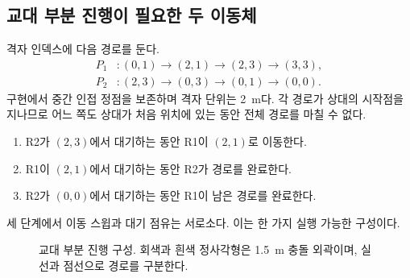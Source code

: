 \documentclass[11pt,a4paper]{article}
\theoremstyle{remark}
\begin{document}
\subsection{교대 부분 진행이 필요한 두 이동체}
격자 인덱스에 다음 경로를 둔다.
\begin{align}
 P_1 &: (0,1)\to(2,1)\to(2,3)\to(3,3),\nonumber\\
 P_2 &: (2,3)\to(0,3)\to(0,1)\to(0,0).
 \label{eq:alternating}
\end{align}
구현에서 중간 인접 정점을 보존하며 격자 단위는 2~m다. 각 경로가 상대의 시작점을 지나므로 어느 쪽도 상대가 처음 위치에 있는 동안 전체 경로를 마칠 수 없다.
\begin{enumerate}
\item R2가 $(2,3)$에서 대기하는 동안 R1이 $(2,1)$로 이동한다.
\item R1이 $(2,1)$에서 대기하는 동안 R2가 경로를 완료한다.
\item R2가 $(0,0)$에서 대기하는 동안 R1이 남은 경로를 완료한다.
\end{enumerate}
세 단계에서 이동 스윕과 대기 점유는 서로소다. 이는 한 가지 실행 가능한 구성이다.
\begin{figure}[htbp]
\centering
{}
\caption{교대 부분 진행 구성. 회색과 흰색 정사각형은 1.5~m 충돌 외곽이며, 실선과 점선으로 경로를 구분한다.}
\label{fig:alternating}
\end{figure}
\end{document}
